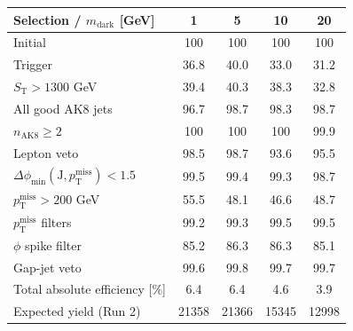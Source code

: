 {\footnotesize\setlength{\tabcolsep}{1.45pt}\renewcommand{\arraystretch}{0.82}%
\begin{tabular}{@{}lcccc@{}}
\hline
Selection / $m_{\mathrm{dark}}$ [GeV] & 1 & 5 & 10 & 20 \\
\hline
Initial & 100 & 100 & 100 & 100 \\
Trigger & 36.8 & 40.0 & 33.0 & 31.2 \\
$S_{\mathrm{T}}>1300$ GeV & 39.4 & 40.3 & 38.3 & 32.8 \\
All good AK8 jets & 96.7 & 98.7 & 98.3 & 98.7 \\
$n_{\mathrm{AK8}}\geq 2$ & 100 & 100 & 100 & 99.9 \\
Lepton veto & 98.5 & 98.7 & 93.6 & 95.5 \\
$\Delta\phi_{\min}(\mathrm{J},p_{\mathrm{T}}^{\mathrm{miss}})<1.5$ & 99.5 & 99.4 & 99.3 & 98.7 \\
$p_{\mathrm{T}}^{\mathrm{miss}}>200$ GeV & 55.5 & 48.1 & 46.6 & 48.7 \\
$p_{\mathrm{T}}^{\mathrm{miss}}$ filters & 99.2 & 99.3 & 99.5 & 99.5 \\
$\phi$ spike filter & 85.2 & 86.3 & 86.3 & 85.1 \\
Gap-jet veto & 99.6 & 99.8 & 99.7 & 99.7 \\
\hline
Total absolute efficiency [\%] & 6.4 & 6.4 & 4.6 & 3.9 \\
\hline
Expected yield (Run 2) & 21358 & 21366 & 15345 & 12998 \\
\hline
\end{tabular}%
}
